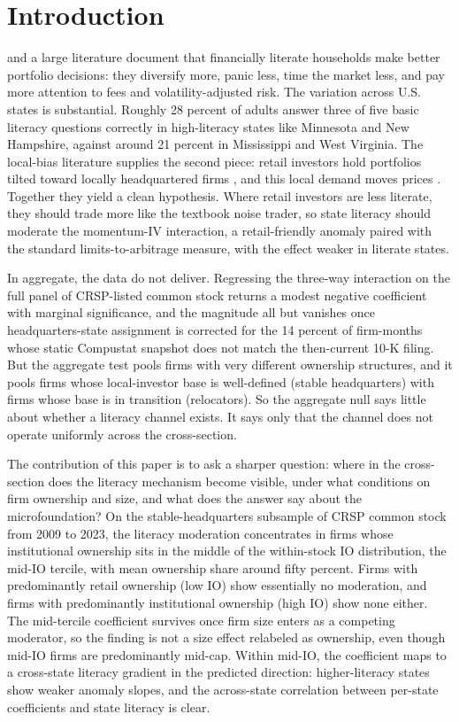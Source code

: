 \section{Introduction}

\citet{lusardiMitchell2014} and a large literature document that financially literate households make better portfolio decisions: they diversify more, panic less, time the market less, and pay more attention to fees and volatility-adjusted risk. The variation across U.S. states is substantial. Roughly 28 percent of adults answer three of five basic literacy questions correctly in high-literacy states like Minnesota and New Hampshire, against around 21 percent in Mississippi and West Virginia. The local-bias literature supplies the second piece: retail investors hold portfolios tilted toward locally headquartered firms \citep{covalMoskowitz1999, ivkovicWeisbenner2005}, and this local demand moves prices \citep{hongKubikStein2008, bernileKumarSulaeman2015}. Together they yield a clean hypothesis. Where retail investors are less literate, they should trade more like the textbook noise trader, so state literacy should moderate the momentum-IV interaction, a retail-friendly anomaly paired with the standard limits-to-arbitrage measure, with the effect weaker in literate states.

In aggregate, the data do not deliver. Regressing the three-way interaction on the full panel of CRSP-listed common stock returns a modest negative coefficient with marginal significance, and the magnitude all but vanishes once headquarters-state assignment is corrected for the 14 percent of firm-months whose static Compustat snapshot does not match the then-current 10-K filing. But the aggregate test pools firms with very different ownership structures, and it pools firms whose local-investor base is well-defined (stable headquarters) with firms whose base is in transition (relocators). So the aggregate null says little about whether a literacy channel exists. It says only that the channel does not operate uniformly across the cross-section.

The contribution of this paper is to ask a sharper question: where in the cross-section does the literacy mechanism become visible, under what conditions on firm ownership and size, and what does the answer say about the microfoundation? On the stable-headquarters subsample of CRSP common stock from 2009 to 2023, the literacy moderation concentrates in firms whose institutional ownership sits in the middle of the within-stock IO distribution, the mid-IO tercile, with mean ownership share around fifty percent. Firms with predominantly retail ownership (low IO) show essentially no moderation, and firms with predominantly institutional ownership (high IO) show none either. The mid-tercile coefficient survives once firm size enters as a competing moderator, so the finding is not a size effect relabeled as ownership, even though mid-IO firms are predominantly mid-cap. Within mid-IO, the coefficient maps to a cross-state literacy gradient in the predicted direction: higher-literacy states show weaker anomaly slopes, and the across-state correlation between per-state coefficients and state literacy is clear.

